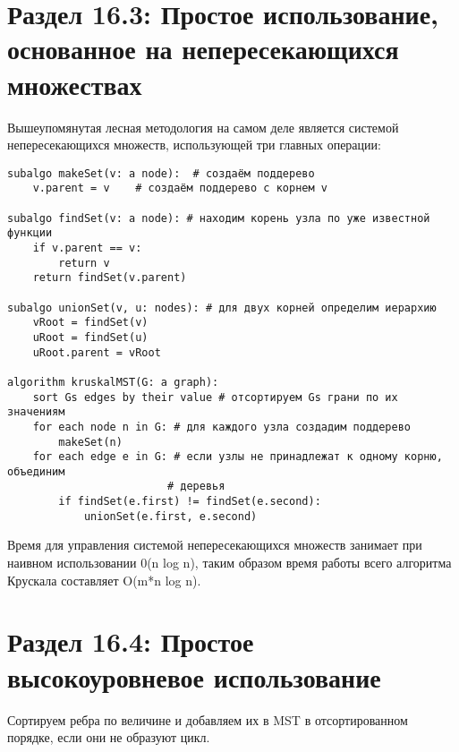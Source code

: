 \vspace{\baselineskip}
\section*{Раздел 16.3: Простое использование, основанное на непересекающихся множествах}

\vspace{\baselineskip}
Вышеупомянутая лесная методология на самом деле является системой непересекающихся множеств, использующей три главных операции:

\vspace{\baselineskip}
\begin{tcolorbox}
\begin{verbatim}
subalgo makeSet(v: a node):  # создаём поддерево
    v.parent = v    # создаём поддерево с корнем v
   
subalgo findSet(v: a node): # находим корень узла по уже известной функции
    if v.parent == v:
        return v
    return findSet(v.parent)

subalgo unionSet(v, u: nodes): # для двух корней определим иерархию
    vRoot = findSet(v)
    uRoot = findSet(u)
    uRoot.parent = vRoot

algorithm kruskalMST(G: a graph):
    sort Gs edges by their value # отсортируем Gs грани по их значениям
    for each node n in G: # для каждого узла создадим поддерево
        makeSet(n)
    for each edge e in G: # если узлы не принадлежат к одному корню, объединим 
                         # деревья
        if findSet(e.first) != findSet(e.second):
            unionSet(e.first, e.second)
\end{verbatim}
\end{tcolorbox}

\vspace{\baselineskip}
Время для управления системой непересекающихся множеств занимает при наивном использовании 0(n log n), таким образом время работы всего алгоритма Крускала составляет O(m*n log n).

\vspace{\baselineskip}
\section*{Раздел 16.4: Простое высокоуровневое использование}

\vspace{\baselineskip}
Сортируем ребра по величине и добавляем их в MST в отсортированном порядке, если они не образуют цикл. 

